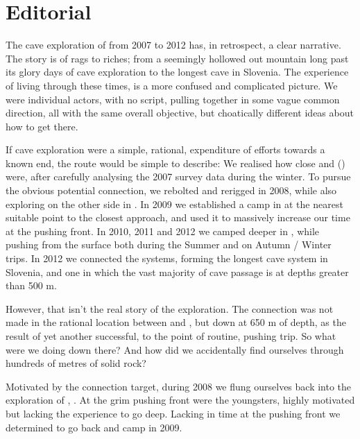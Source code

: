 \chapter*{Editorial}


The cave exploration of  from 2007 to 2012 has, in
retrospect, a clear narrative. 
The story is of rags to riches; from a
seemingly hollowed out mountain long past its glory days of cave exploration
to the longest cave in Slovenia. The experience of living through these
times, is a more confused and complicated picture. We were individual
actors, with no script, pulling together in some vague common
direction, all with the same overall objective, but choatically different
ideas about how to get there.

If cave exploration were a simple, rational, expenditure of efforts
towards a known end, the route would be simple to describe: We realised
how close  and  () were, after 
carefully analysing the 2007  survey data during the winter. To pursue
the obvious potential connection, we rebolted and rerigged 
in 2008, while also exploring on the other side in . In 2009 we established a camp in  at the nearest suitable point to the closest approach, and used it to massively increase our time at the pushing front. In 2010, 2011 and 2012 we camped deeper in ,
while pushing  from the surface both during the Summer and on
Autumn / Winter trips. In 2012 we connected the systems, forming the
longest cave system in Slovenia, and one in which the vast majority of
cave passage is at depths greater than 500 m.

However, that isn't the real story of the exploration. 
The connection was not
made in the rational location between  and , but down
at 650 m of depth, as the result of yet another successful, to the point
of routine, pushing trip. So what were we doing down there? And how did we accidentally find ourselves through hundreds of metres of solid rock?

Motivated by the connection target, during 2008 we flung ourselves back into the exploration of , . At the grim pushing front were the youngsters, highly motivated but lacking the experience to go deep. Lacking in time at the pushing front we determined to go back and camp in 2009. 

